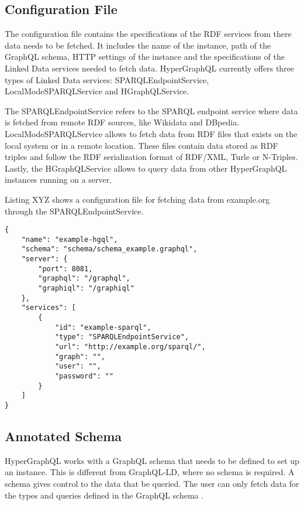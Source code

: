 \subsection{Configuration File}

The configuration file contains the specifications of the RDF services from there data needs to be fetched. It includes the name of the instance, path of the GraphQL schema, HTTP settings of the instance and the specifications of the Linked Data services needed to fetch data. HyperGraphQL currently offers three types of Linked Data services: SPARQLEndpointService, LocalModeSPARQLService and HGraphQLService. 

The SPARQLEndpointService refers to the SPARQL endpoint service where data is fetched from remote RDF sources, like Wikidata and DBpedia. LocalModeSPARQLService allows to fetch data from RDF files that exists on the local system or in a remote location. These files contain data stored as RDF triples and follow the RDF serialization format of RDF/XML, Turle or N-Triples. Lastly, the HGraphQLService allows to query data from other HyperGraphQL instances running on a server.

Listing XYZ shows a configuration file for fetching data from example.org through the SPARQLEndpointService.

\begin{minipage}{\linewidth}
\begin{lstlisting}[label=listing:listing13, caption={An example configuration file}]
{
    "name": "example-hgql",
    "schema": "schema/schema_example.graphql",
    "server": {
        "port": 8081,
        "graphql": "/graphql",
        "graphiql": "/graphiql"
    },
    "services": [
        {
            "id": "example-sparql",
            "type": "SPARQLEndpointService",
            "url": "http://example.org/sparql/",
            "graph": "",
            "user": "",
            "password": ""
        }
    ]
}
\end{lstlisting}
\end{minipage}

\subsection{Annotated Schema}

HyperGraphQL works with a GraphQL schema that needs to be defined to set up an instance. This is different from GraphQL-LD, where no schema is required. A schema gives control to the data that be queried. The user can only fetch data for the types and queries defined in the GraphQL schema \cite{Gleim2020}.


